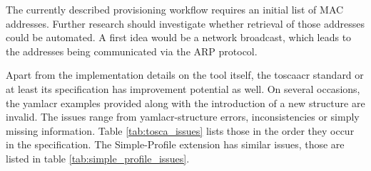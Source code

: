 The currently described provisioning workflow requires an initial list of MAC addresses. Further research should investigate whether retrieval of those addresses could be automated. A first idea would be a network broadcast, which leads to the addresses being communicated via the ARP protocol.

Apart from the implementation details on the tool itself, the \gls{toscaacr} standard or at least its specification has improvement potential as well. On several occasions, the \gls{yamlacr} examples provided along with the introduction of a new structure are invalid. The issues range from \gls{yamlacr}-structure errors, inconsistencies or simply missing information. Table \ref{tab:tosca_issues} lists those in the order they occur in the specification. The Simple-Profile extension has similar issues, those are listed in table \ref{tab:simple_profile_issues}.


